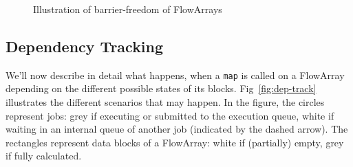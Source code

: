 \documentclass[runningheads,a4paper,fleqn]{llncs}
\begin{document}
\begin{figure}
  \caption{Illustration of barrier-freedom of FlowArrays}
  \label{fig:barrier-free}
\end{figure}

\subsection{Dependency Tracking}
We'll now describe in detail what happens, when a \texttt{map} is
called on a FlowArray depending on the different possible states of
its blocks. Fig~\ref{fig:dep-track} illustrates the different
scenarios that may happen. In the figure, the circles represent jobs:
grey if executing or submitted to the execution queue, white if
waiting in an internal queue of another job (indicated by the dashed
arrow). The rectangles represent data blocks of a FlowArray: white if
(partially) empty, grey if fully calculated.
\end{document}
